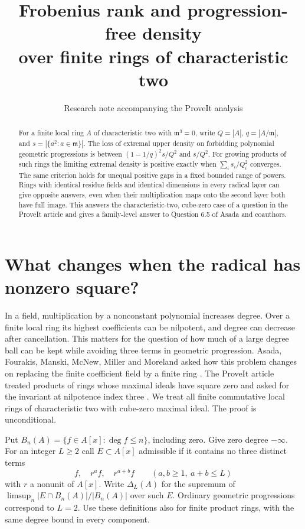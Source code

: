 \documentclass[11pt]{article}
\title{Frobenius rank and progression-free density\\over finite rings of characteristic two}
\author{Research note accompanying the ProveIt analysis}
\date{}
\newcommand{\m}{\mathfrak m}
\begin{document}
\maketitle
\begin{abstract}
For a finite local ring $A$ of characteristic two with $\m^3=0$, write $Q=|A|$, $q=|A/\m|$, and $s=|\{a^2:a\in\m\}|$. The loss of extremal upper density on forbidding polynomial geometric progressions is between $(1-1/q)^2s/Q^2$ and $s/Q^2$. For growing products of such rings the limiting extremal density is positive exactly when $\sum_i s_i/Q_i^2$ converges. The same criterion holds for unequal positive gaps in a fixed bounded range of powers. Rings with identical residue fields and identical dimensions in every radical layer can give opposite answers, even when their multiplication maps onto the second layer both have full image. This answers the characteristic-two, cube-zero case of a question in the ProveIt article and gives a family-level answer to Question 6.5 of Asada and coauthors.
\end{abstract}

\section{What changes when the radical has nonzero square?}
In a field, multiplication by a nonconstant polynomial increases degree. Over a finite local ring its highest coefficients can be nilpotent, and degree can decrease after cancellation. This matters for the question of how much of a large degree ball can be kept while avoiding three terms in geometric progression. Asada, Fourakis, Manski, McNew, Miller and Moreland asked how this problem changes on replacing the finite coefficient field by a finite ring \cite[Question 6.5]{asada}. The ProveIt article treated products of rings whose maximal ideals have square zero and asked for the invariant at nilpotence index three \cite{repo}. We treat all finite commutative local rings of characteristic two with cube-zero maximal ideal. The proof is unconditional.

Put $B_n(A)=\{f\in A[x]:\deg f\le n\}$, including zero. Give zero degree $-\infty$. For an integer $L\ge2$ call $E\subset A[x]$ admissible if it contains no three distinct terms
\[
              f,\quad r^a f,\quad r^{a+b}f
              \qquad(a,b\ge1,\ a+b\le L)
\]
with $r$ a nonunit of $A[x]$. Write $\Delta_L(A)$ for the supremum of $\limsup_n |E\cap B_n(A)|/|B_n(A)|$ over such $E$. Ordinary geometric progressions correspond to $L=2$. Use these definitions also for finite product rings, with the same degree bound in every component.
\end{document}
